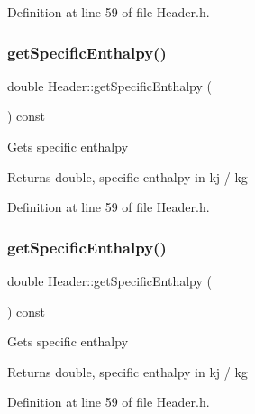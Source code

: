 Definition at line 59 of file Header.\+h.

\mbox{\label{class_header_af913dbf132f8cb3af6e6b374813acd93}} 
\subsubsection{\texorpdfstring{get\+Specific\+Enthalpy()}{getSpecificEnthalpy()}\hspace{0.1cm}{\footnotesize\ttfamily [2/3]}}
{\footnotesize\ttfamily double Header\+::get\+Specific\+Enthalpy (\begin{DoxyParamCaption}{ }\end{DoxyParamCaption}) const\hspace{0.3cm}{\ttfamily [inline]}}

Gets specific enthalpy \begin{DoxyReturn}{Returns}
double, specific enthalpy in kj / kg 
\end{DoxyReturn}


Definition at line 59 of file Header.\+h.

\mbox{\label{class_header_af913dbf132f8cb3af6e6b374813acd93}} 
\subsubsection{\texorpdfstring{get\+Specific\+Enthalpy()}{getSpecificEnthalpy()}\hspace{0.1cm}{\footnotesize\ttfamily [3/3]}}
{\footnotesize\ttfamily double Header\+::get\+Specific\+Enthalpy (\begin{DoxyParamCaption}{ }\end{DoxyParamCaption}) const\hspace{0.3cm}{\ttfamily [inline]}}

Gets specific enthalpy \begin{DoxyReturn}{Returns}
double, specific enthalpy in kj / kg 
\end{DoxyReturn}


Definition at line 59 of file Header.\+h.

\mbox{\label{class_header_a3af0b7964b74287ce0c662b9a88556ed}} 
